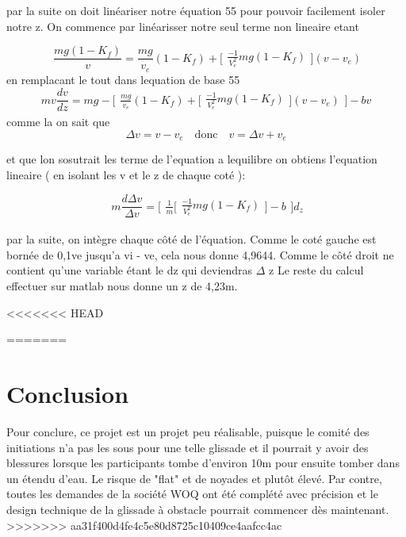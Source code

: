 \documentclass{article}
\begin{document}
par la suite on doit linéariser notre équation 55 pour pouvoir facilement isoler notre z. On commence par linéarisser notre seul terme non lineaire etant 

\begin{equation}
\ \frac{mg ( 1- K_{f})}{v} = \frac{mg}{v_{e}}(1-K_{f})+
\Bigg[\begin{array}{cc}
    \frac{-1}{V_{e}^2}mg(1-K_{f})
    \end{array}\Bigg]
    (v-v_{e})
\end{equation}
en remplacant le tout dans lequation de base 55
\begin{equation}
mv \frac{dv}{dz} = mg - \Bigg[\begin{array}{cc}
\frac{mg}{v_{e}}(1-K_{f})+
\Bigg[\begin{array}{cc}
    \frac{-1}{V_{e}^2}mg(1-K_{f})
    \end{array}\Bigg]
    (v-v_{e}) \end{array}\Bigg] - bv
\end{equation}
comme la on sait que
\begin{equation}
\Delta v = v - v_{e}  \quad  \textrm{donc} \quad    v = \Delta v+ v_{e}
\end{equation}

et que lon sosutrait les terme de l'equation a lequilibre on obtiens l'equation lineaire  ( en isolant les v et le z de chaque coté ):

\begin{equation}
\ m \frac{d \Delta v}{\Delta v}= \Bigg[\begin{array}{cc} \frac{1}{m} \Bigg[\begin{array}{cc}
    \frac{-1}{V_{e}^2}mg(1-K_{f})
    \end{array}\Bigg]  - b\end{array}\Bigg] d_{z}
\end{equation}

par la suite, on intègre chaque côté de l'équation. Comme le coté gauche est bornée de 0,1ve jusqu'a vi - ve, cela nous donne 4,9644. Comme le côté droit ne contient qu'une variable étant le dz qui deviendras $\Delta$ z
 Le reste du calcul effectuer sur matlab nous donne un z de 4,23m.
 
<<<<<<< HEAD
 


=======
\section{Conclusion}
Pour conclure, ce projet est un projet peu réalisable, puisque le comité des initiations n'a pas les sous pour une telle glissade et il pourrait y avoir des blessures lorsque les participants tombe d'environ 10m pour ensuite tomber dans un étendu d'eau. Le risque de "flat" et de noyades et plutôt élevé. Par contre, toutes les demandes de la société WOQ ont été complété avec précision et le design technique de la glissade à obstacle pourrait commencer dès maintenant.
>>>>>>> aa31f400d4fe4c5e80d8725c10409ce4aafcc4ac
\end{document}
